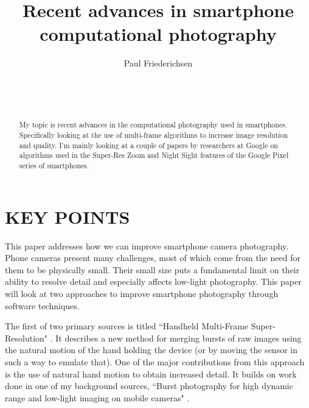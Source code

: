 \documentclass{sig-alternate}
\begin{document}

\title{Recent advances in smartphone computational photography}


\author{
\alignauthor
Paul Friederichsen\\
	\\
	\\
	\\
}

\maketitle

\begin{abstract}
My topic is recent advances in the computational photography used in smartphones. Specifically looking at the use of multi-frame algorithms to increase image resolution and quality. I'm mainly looking at a couple of papers by researchers at Google on algorithms used in the Super-Res Zoom and Night Sight features of the Google Pixel series of smartphones.
\end{abstract}

\section*{\uppercase{Key points}}

This paper addresses how we can improve smartphone camera photography. Phone cameras present many challenges, most of which come from the need for them to be physically small. Their small size puts a fundamental limit on their ability to resolve detail and especially affects low-light photography. This paper will look at two approaches to improve smartphone photography through software techniques.

The first of two primary sources is titled ``Handheld Multi-Frame Super-Resolution" \cite{Wronski2019}. It describes a new method for merging bursts of raw images using the natural motion of the hand holding the device (or by moving the sensor in such a way to emulate that). One of the major contributions from this approach is the use of natural hand motion to obtain increased detail. It builds on work done in one of my background sources, ``Burst photography for high dynamic range and low-light imaging on mobile cameras" \cite{Hasinoff2016}.
\end{document}
